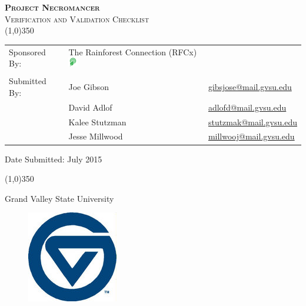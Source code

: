 \documentclass{article}
\newcommand{\ASSNMT}{Project Necromancer}
\newcommand{\CLASS}{Verification and Validation Checklist}
\newcommand{\Footer}{Grand Valley State University}
\newcommand{\DATE}{July 2015}
\numberwithin{figure}{section}
\numberwithin{equation}{section}
\begin{document}
\begin{flushleft}

\textsc{\LARGE \bfseries \ASSNMT}\\

\textsc{\Large \CLASS}\\[0.2cm]
\linethickness{0.5mm}
{\color{ForestGreen}\line(1,0){350}} \\ [1.0cm]

\begin{flushleft} \large
\begin{tabular}{lll}
  Sponsored By: & The Rainforest Connection (RFCx) \includegraphics[height=0.4cm]{rfcxlogo} & \\
                &               & \\
  Submitted By: & Joe Gibson    & \href{mailto:gibsjose@mail.gvsu.edu}{gibsjose@mail.gvsu.edu}\\
              & David Adlof     & \href{mailto:adlofd@mail.gvsu.edu}{adlofd@mail.gvsu.edu}\\
              & Kalee Stutzman  & \href{mailto:stutzmak@mail.gvsu.edu}{stutzmak@mail.gvsu.edu}\\
              & Jesse Millwood  & \href{mailto:millwooj@mail.gvsu.edu}{millwooj@mail.gvsu.edu}\\
\end{tabular}

\bigskip

\bigskip
Date Submitted: \DATE
\end{flushleft}

\smallskip
{\color{ForestGreen}\line(1,0){350}} \\ [1.0cm]

\vfill

\begin{center}
{\large \Footer}
\end{center}
\begin{figure}[H]
  \centering
  \includegraphics[width=.1\textwidth]{small_gvsu}
\end{figure}
\end{flushleft}
\end{document}
